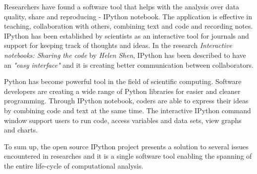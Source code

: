

Researchers have found a software tool that helps with the analysis over data quality, share and reproducing - IPython notebook. The application is effective in teaching, collaboration with others, combining text and code and recording notes. IPython has been established by scientists as an interactive tool for journals and support for keeping track of thoughts and ideas. In the research \textit{Interactive notebooks: Sharing the code} by \textit{Helen Shen}, IPython has been described to have an \textit{"easy interface"} and it is creating better communication between collaborators.\cite{shen2014interactive}

Python has become powerful tool in the field of scientific computing. Software developers are creating a wide range of Python libraries for easier and cleaner programming. Through IPython notebook, coders are able to express their ideas by combining code and text at the same time. The interactive IPython command window support users to run code, access variables and data sets, view graphs and charts.\cite{perez2013open}

To sum up, the open source IPython project presents a solution to several issues encountered in researches and it is a single software tool enabling the spanning of the entire life-cycle of computational analysis. 

